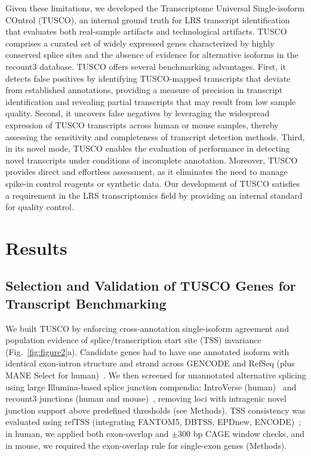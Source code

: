 \documentclass[pdflatex,sn-nature]{sn-jnl}%
\begin{document}
Given these limitations, we developed the Transcriptome Universal Single-isoform COntrol (TUSCO), an internal ground truth for LRS transcript identification that evaluates both real-sample artifacts and technological artifacts. TUSCO comprises a curated set of widely expressed genes characterized by highly conserved splice sites and the absence of evidence for alternative isoforms in the recount3\cite{Wilks2021recount3} database. TUSCO offers several benchmarking advantages. First, it detects false positives by identifying TUSCO-mapped transcripts that deviate from established annotations, providing a measure of precision in transcript identification and revealing partial transcripts that may result from low sample quality. Second, it uncovers false negatives by leveraging the widespread expression of TUSCO transcripts across human or mouse samples, thereby assessing the sensitivity and completeness of transcript detection methods. Third, in its novel mode, TUSCO enables the evaluation of performance in detecting novel transcripts under conditions of incomplete annotation. Moreover, TUSCO provides direct and effortless assessment, as it eliminates the need to manage spike-in control reagents or synthetic data. Our development of TUSCO satisfies a requirement in the LRS transcriptomics field by providing an internal standard for quality control.


\section{Results}

\subsection{Selection and Validation of TUSCO Genes for Transcript Benchmarking}

We built TUSCO by enforcing cross-annotation single-isoform agreement and population evidence of splice/transcription start site (TSS) invariance (Fig.~\ref{fig:figure2}a). Candidate genes had to have one annotated isoform with identical exon-intron structure and strand across GENCODE and RefSeq (plus MANE Select for human)~\cite{Mudge2025GENCODE,Goldfarb2025NCBI,Morales2022Joint}. We then screened for unannotated alternative splicing using large Illumina-based splice junction compendia: IntroVerse (human)~\cite{GarciaRuiz2023IntroVerse} and recount3 junctions (human and mouse)~\cite{Wilks2021recount3}, removing loci with intragenic novel junction support above predefined thresholds (see Methods). TSS consistency was evaluated using refTSS (integrating FANTOM5, DBTSS, EPDnew, ENCODE)~\cite{Abugessaisa2019refTSS}; in human, we applied both exon-overlap and $\pm 300$ bp CAGE window checks, and in mouse, we required the exon-overlap rule for single-exon genes (Methods).
\end{document}
